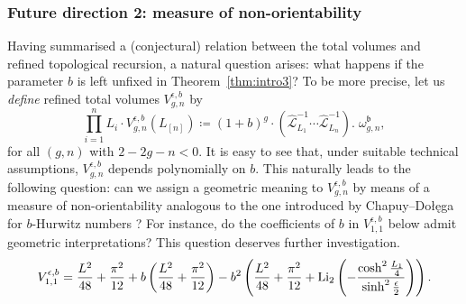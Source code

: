 \documentclass[12pt]{amsart}
\theoremstyle{plain}
\newtheorem{conjecture}[theorem]{Conjecture}
\theoremstyle{definition}
\theoremstyle{remark}
\numberwithin{equation}{section}
\begin{document}





\subsubsection{Future direction 2: measure of non-orientability}

Having summarised a (conjectural) relation between the total volumes and refined topological recursion, a natural question arises: what happens if the parameter $b$ is left unfixed in Theorem~\ref{thm:intro3}? To be more precise, let us \emph{define} refined total volumes $V_{g,n}^{\epsilon,b}$ by
\[  \prod_{i=1}^nL_i\cdot V_{g,n}^{\epsilon,b}(L_{[n]})\coloneqq (1+b)^{g}\cdot (\hat{\mathcal{L}}_{L_1}^{-1}\cdots \hat{\mathcal{L}}_{L_n}^{-1}).\;\omega^\mathfrak{b}_{g,n},\]
for all $(g,n)$ with $2-2g-n<0$. It is easy to see that, under suitable technical assumptions, $V_{g,n}^{\epsilon,b}$ depends polynomially on $b$. This naturally leads to the following question: can we assign a geometric meaning to $V_{g,n}^{\epsilon,b}$ by means of a measure of non-orientability analogous to the one introduced by Chapuy--Do\l\k{e}ga for $b$-Hurwitz numbers \cite{CD20}? For instance, do the coefficients of $b$ in $V_{1,1}^{\epsilon,b}$ below admit geometric interpretations? This question deserves further investigation.
\[V_{1,1}^{\epsilon,b}=\frac{L^2}{48}+\frac{\pi^2}{12}+b\left(\frac{L^2}{48}+\frac{\pi^2}{12}\right)-b^2\left(\frac{L^2}{48}+\frac{\pi^2}{12}+{\rm Li}_2\left(-\frac{\cosh^2\frac{L_1}{4}}{\sinh^2\frac{\epsilon}{2}}\right)\right).\]
\end{document}
